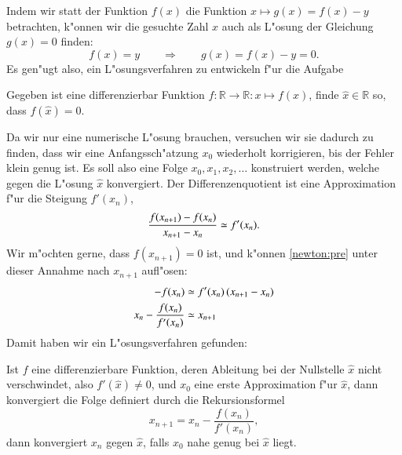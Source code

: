 Indem wir statt der Funktion $f(x)$ die Funktion $x\mapsto g(x)=f(x)-y$
betrachten, k"onnen wir die gesuchte Zahl $x$ auch als L"osung der
Gleichung $g(x)=0$ finden:
\begin{equation}
f(x)=y
\qquad
\Rightarrow
\qquad
g(x)=f(x)-y = 0.
\label{newton:reduktion}
\end{equation}
Es gen"ugt also, ein L"osungsverfahren zu entwickeln f"ur die Aufgabe
\begin{aufgabe}
Gegeben ist eine differenzierbar Funktion
$f\colon\mathbb R\to\mathbb R:x\mapsto f(x)$,
finde $\hat{x}\in\mathbb R$ so, dass $f(\hat{x})=0$.
\end{aufgabe}
Da wir nur eine numerische L"osung brauchen, versuchen wir sie dadurch
zu finden, dass wir eine Anfangssch"atzung $x_0$ wiederholt korrigieren,
bis der Fehler klein genug ist.
Es soll also eine Folge $x_0,x_1,x_2,\dots$ konstruiert werden, welche
gegen die L"osung $\hat{x}$ konvergiert.
Der Differenzenquotient ist eine Approximation f"ur die Steigung
$f'(x_n)$,
\begin{equation}
\frac{
f(x_{\mathstrut n+1})-f(x_{\mathstrut n})
}{
x_{\mathstrut n+1}-x_{\mathstrut n}
}
\simeq f'(x_n).
\label{newton:pre}
\end{equation}
Wir m"ochten gerne, dass $f(x_{n+1})=0$ ist, und k"onnen \eqref{newton:pre}
unter dieser Annahme nach $x_{n+1}$ aufl"osen:
\begin{align*}
-f(x_n)
&\simeq
f'(x_n)\,(x_{\mathstrut n+1}-x_{\mathstrut n})
\\
x_{\mathstrut n}-\frac{f(x_n)}{f'(x_n)}
&\simeq x_{\mathstrut n+1}
\end{align*}
Damit haben wir ein L"osungsverfahren gefunden:
\begin{satz}[Newton]
\label{newton:satz}
Ist $f$ eine differenzierbare Funktion, deren Ableitung bei der Nullstelle
$\hat{x}$ nicht verschwindet, also $f'(\hat{x})\ne 0$, und $x_0$ eine erste
Approximation f"ur $\hat{x}$, dann konvergiert die Folge
definiert durch die Rekursionsformel
\[
x_{n+1}=x_n-\frac{f(x_n)}{f'(x_n)},
\]
dann konvergiert $x_n$ gegen $\hat{x}$, falls $x_0$ nahe genug bei
$\hat{x}$ liegt.
\end{satz}

